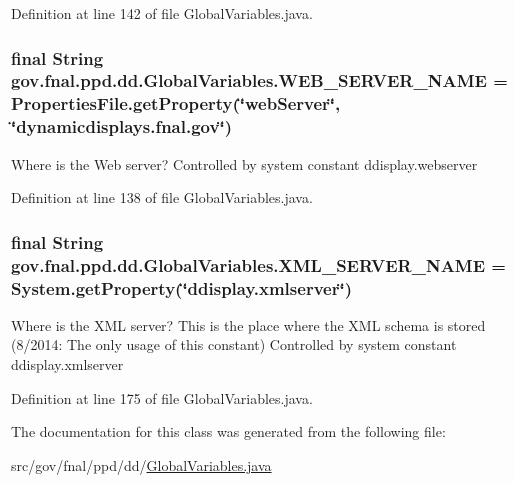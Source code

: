 Definition at line 142 of file Global\-Variables.\-java.

\hypertarget{classgov_1_1fnal_1_1ppd_1_1dd_1_1GlobalVariables_af5ffb15826513fabba402ec017edbc70}{
\subsubsection[{W\-E\-B\-\_\-\-S\-E\-R\-V\-E\-R\-\_\-\-N\-A\-M\-E}]{\setlength{\rightskip}{0pt plus 5cm}final String gov.\-fnal.\-ppd.\-dd.\-Global\-Variables.\-W\-E\-B\-\_\-\-S\-E\-R\-V\-E\-R\-\_\-\-N\-A\-M\-E = {\bf Properties\-File.\-get\-Property}(\char`\"{}web\-Server\char`\"{}, \char`\"{}dynamicdisplays.\-fnal.\-gov\char`\"{})\hspace{0.3cm}{\ttfamily [static]}}}\label{classgov_1_1fnal_1_1ppd_1_1dd_1_1GlobalVariables_af5ffb15826513fabba402ec017edbc70}
Where is the Web server? Controlled by system constant ddisplay.\-webserver 

Definition at line 138 of file Global\-Variables.\-java.

\hypertarget{classgov_1_1fnal_1_1ppd_1_1dd_1_1GlobalVariables_a1b1eb1c9096380d09b968cd474e8bb86}{
\subsubsection[{X\-M\-L\-\_\-\-S\-E\-R\-V\-E\-R\-\_\-\-N\-A\-M\-E}]{\setlength{\rightskip}{0pt plus 5cm}final String gov.\-fnal.\-ppd.\-dd.\-Global\-Variables.\-X\-M\-L\-\_\-\-S\-E\-R\-V\-E\-R\-\_\-\-N\-A\-M\-E = System.\-get\-Property(\char`\"{}ddisplay.\-xmlserver\char`\"{})\hspace{0.3cm}{\ttfamily [static]}}}\label{classgov_1_1fnal_1_1ppd_1_1dd_1_1GlobalVariables_a1b1eb1c9096380d09b968cd474e8bb86}
Where is the X\-M\-L server? This is the place where the X\-M\-L schema is stored (8/2014\-: The only usage of this constant) Controlled by system constant ddisplay.\-xmlserver 

Definition at line 175 of file Global\-Variables.\-java.



The documentation for this class was generated from the following file\-:\begin{DoxyCompactItemize}
\item 
src/gov/fnal/ppd/dd/\hyperlink{GlobalVariables_8java}{Global\-Variables.\-java}\end{DoxyCompactItemize}
